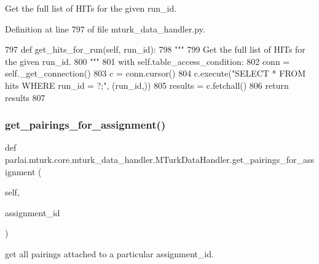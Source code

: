 \begin{DoxyVerb}Get the full list of HITs for the given run_id.
\end{DoxyVerb}
 

Definition at line 797 of file mturk\+\_\+data\+\_\+handler.\+py.


\begin{DoxyCode}
797     \textcolor{keyword}{def }get\_hits\_for\_run(self, run\_id):
798         \textcolor{stringliteral}{"""}
799 \textcolor{stringliteral}{        Get the full list of HITs for the given run\_id.}
800 \textcolor{stringliteral}{        """}
801         with self.table\_access\_condition:
802             conn = self.\_get\_connection()
803             c = conn.cursor()
804             c.execute(\textcolor{stringliteral}{"SELECT * FROM hits WHERE run\_id = ?;"}, (run\_id,))
805             results = c.fetchall()
806             \textcolor{keywordflow}{return} results
807 
\end{DoxyCode}
\mbox{\label{classparlai_1_1mturk_1_1core_1_1mturk__data__handler_1_1MTurkDataHandler_a092a03e29a20f0b40b9d33e1e002395a}} 
\subsubsection{\texorpdfstring{get\+\_\+pairings\+\_\+for\+\_\+assignment()}{get\_pairings\_for\_assignment()}}
{\footnotesize\ttfamily def parlai.\+mturk.\+core.\+mturk\+\_\+data\+\_\+handler.\+M\+Turk\+Data\+Handler.\+get\+\_\+pairings\+\_\+for\+\_\+assignment (\begin{DoxyParamCaption}\item[{}]{self,  }\item[{}]{assignment\+\_\+id }\end{DoxyParamCaption})}

\begin{DoxyVerb}get all pairings attached to a particular assignment_id.
\end{DoxyVerb}
 

